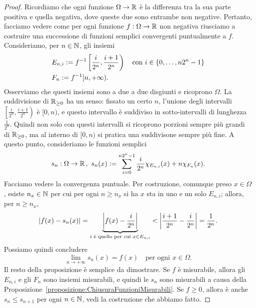 \begin{proof}
Ricordiamo che ogni funzione \(\Omega \to \mathbb R\) è la differenza tra la sua parte positiva e quella negativa, dove queste due sono entrambe non negative. Pertanto, facciamo vedere come per ogni funzione \(f : \Omega \to \mathbb R\) non negativa riusciamo a costruire una successione di funzioni semplici convergenti puntualmente a \(f\). Consideriamo, per \(n \in \mathbb N\), gli insiemi
\begin{align*}
& E_{n,i} := f^{-1}\left[\frac{i}{2^n}, \frac{i+1}{2^n}\right) \quad \text{con } i \in \left\{0, \dots{}, n2^n-1\right\} \\
& F_n := f^{-1}[n, +\infty) .
\end{align*}
Osserviamo che questi insiemi sono a due a due disgiunti e ricoprono \(\Omega\). La suddivisione di \(\mathbb R_{\ge 0}\) ha un senso: fissato un certo \(n\), l'unione degli intervalli \(\left[\frac{i}{2^n}, \frac{i+1}{2^n}\right)\) è \([0, n)\), e questo intervallo è suddiviso in sotto-intervalli di lunghezza \(\frac{1}{2^n}\). Quindi non solo con questi intervalli si ricoprono porzioni sempre più grandi di \(\mathbb R_{\ge 0}\), ma al interno di \([0, n)\) si pratica una suddivisone sempre più fine.\newline
A questo punto, consideriamo le funzioni semplici
\[s_n : \Omega \to \mathbb R \,,\ s_n(x) := \sum_{i=0}^{n2^n-1} \frac{i}{2^n} \chi_{E_{n, i}}(x) + n \chi_{F_n}(x) .\]
Facciamo vedere la convergenza puntuale. Per costruzione, comunque preso \(x \in \Omega\), esiste \(n_x \in \mathbb N\) per cui per ogni \(n \ge n_x\) si ha \(x\) sta in uno e un solo \(E_{n, i}\); allora, per \(n \ge n_x\), 
\[\left\lvert f(x) - s_n(x)\right\rvert = \underbrace{\left\lvert f(x) - \frac{i}{2^n}\right\rvert}_{i \text{ è quello per cui } x \in E_{n, i}} < \left\lvert\frac{i+1}{2^n} -\frac{i}{2^n}\right\rvert = \frac{1}{2^n} .\]
Possiamo quindi concludere
\[\lim_{n \to +\infty} s_n(x) = f(x) \quad \text{per ogni } x \in \Omega .\]
Il resto della proposizione è semplice da dimostrare. Se \(f\) è misurabile, allora gli \(E_{n, i}\) e gli \(F_n\) sono insiemi misurabili, e quindi le \(s_n\) sono misurabili a causa della Proposizione~\ref{proposizione:ChiusuraFunzioniMisurabili}. Se \(f \ge 0\), allora è anche \(s_n \le s_{n+1}\) per ogni \(n \in \mathbb N\), vedi la costruzione che abbiamo fatto.
\end{proof}

